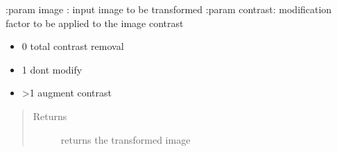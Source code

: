 \documentclass[letterpaper,10pt,english]{sphinxmanual}
\begin{document}
\begin{fulllineitems}
\label{\detokenize{ida_lib.operations:ida_lib.operations.pixel_ops_functional.change_contrast}}
:param image  : input image to be transformed
:param contrast: modification factor to be applied to the image contrast
\begin{itemize}
\item {} 
0  \sphinxhyphen{} total contrast removal

\item {} 
1  \sphinxhyphen{} dont modify

\item {} 
\textgreater{}1 \sphinxhyphen{} augment contrast

\end{itemize}
\begin{quote}\begin{description}
\item[{Returns}] \leavevmode
returns the transformed image

\end{description}\end{quote}

\end{fulllineitems}

\end{document}
